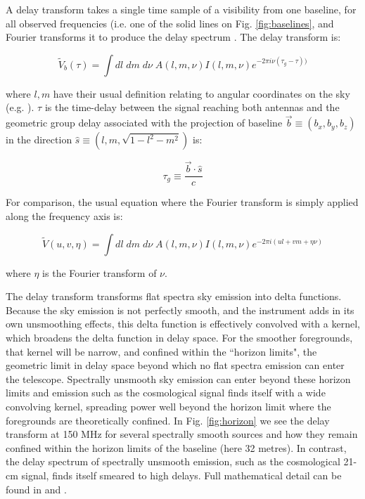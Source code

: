 A delay transform takes a single time sample of a visibility from one baseline, for all observed frequencies (i.e. one of the solid lines on Fig. \ref{fig:baselines}, and Fourier transforms it to produce the delay spectrum \cite{Parsons2012ApJ...756..165P,Parsons2012ApJ...753...81P,Parsons2009AJ....138..219P}. The delay transform is:

\begin{equation}
    \widetilde{V}_b(\tau) = \int dl \; dm \; d\nu \; A(l,m,\nu)I(l,m,\nu)e^{-2\pi i\nu(\tau_g-\tau))}
\end{equation}

\noindent where $l,m$ have their usual definition relating to angular coordinates on the sky (e.g. \cite{Thompson2001isra.book.....T}). $\tau$ is the time-delay between the signal reaching both antennas and the geometric group delay associated with the projection of baseline $\overrightarrow{b} \equiv (b_x,b_y,b_z) $ in the direction $ \hat{s} \equiv (l,m,\sqrt{1-l^2-m^2})$ is:

\begin{equation}
    \tau_g \equiv \frac{\overrightarrow{b} \cdot \hat{s}}{c} 
\end{equation}

For comparison, the usual equation where the Fourier transform is simply applied along the frequency axis is:

\begin{equation}
    \widetilde{V}(u,v,\eta) = \int dl \; dm \; d\nu \; A(l,m,\nu)I(l,m,\nu)e^{-2\pi i(ul+vm+\eta\nu)}
\end{equation}

\noindent where $\eta$ is the Fourier transform of $\nu$.

The delay transform transforms flat spectra sky emission into delta functions. Because the sky emission is not perfectly smooth, and the instrument adds in its own unsmoothing effects, this delta function is effectively convolved with a kernel, which broadens the delta function in delay space. For the smoother foregrounds, that kernel will be narrow, and confined within the ``horizon limits", the geometric limit in delay space beyond which no flat spectra emission can enter the telescope. Spectrally unsmooth sky emission can enter beyond these horizon limits and emission such as the cosmological signal finds itself with a wide convolving kernel, spreading power well beyond the horizon limit where the foregrounds are theoretically confined. In Fig. \ref{fig:horizon} we see the delay transform at 150 MHz for several spectrally smooth sources and how they remain confined within the horizon limits of the baseline (here 32 metres). In contrast, the delay spectrum of spectrally unsmooth emission, such as the cosmological 21-cm signal, finds itself smeared to high delays. Full mathematical detail can be found in \cite{Parsons2012ApJ...756..165P,Parsons2012ApJ...753...81P} and \cite{Parsons2009AJ....138..219P}.

